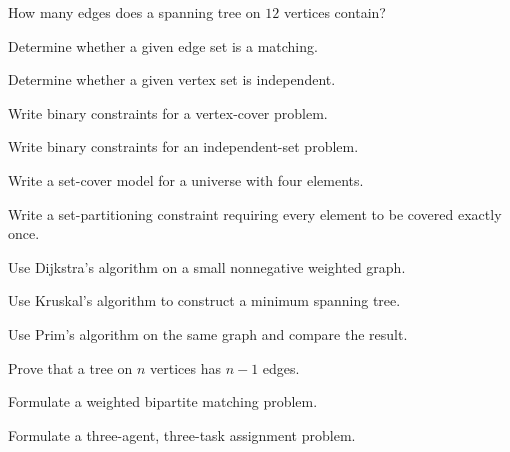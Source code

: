\begin{exercise}[2]
How many edges does a spanning tree on \(12\) vertices contain?
\end{exercise}

\begin{exercise}[2]
Determine whether a given edge set is a matching.
\end{exercise}

\begin{exercise}[2]
Determine whether a given vertex set is independent.
\end{exercise}

\begin{exercise}[2]
Write binary constraints for a vertex-cover problem.
\end{exercise}

\begin{exercise}[2]
Write binary constraints for an independent-set problem.
\end{exercise}

\begin{exercise}[2]
Write a set-cover model for a universe with four elements.
\end{exercise}

\begin{exercise}[2]
Write a set-partitioning constraint requiring every element to be covered
exactly once.
\end{exercise}

\begin{exercise}[3]
Use Dijkstra's algorithm on a small nonnegative weighted graph.
\end{exercise}

\begin{exercise}[3]
Use Kruskal's algorithm to construct a minimum spanning tree.
\end{exercise}

\begin{exercise}[3]
Use Prim's algorithm on the same graph and compare the result.
\end{exercise}

\begin{exercise}[3]
Prove that a tree on \(n\) vertices has \(n-1\) edges.
\end{exercise}

\begin{exercise}[3]
Formulate a weighted bipartite matching problem.
\end{exercise}

\begin{exercise}[3]
Formulate a three-agent, three-task assignment problem.
\end{exercise}

